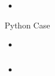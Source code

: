 \documentclass[utf8x]{beamer}
\begin{document}
\begin{frame}
  \frametitle{}
  \begin{itemize}
  \item
  \end{itemize}
  \pause
  \begin{block}{
    Python Case}
    \begin{itemize}
    \item
    \end{itemize}
  \end{block}
\end{frame}



\begin{frame}
  \frametitle{}
  \begin{itemize}
  \item
  \end{itemize}
\end{frame}
\end{document}
